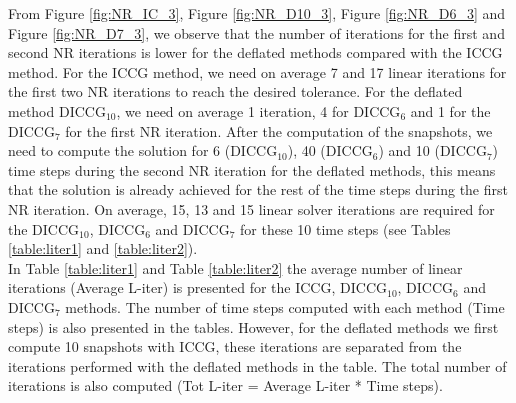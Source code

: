 \documentclass[12pt]{article}
\begin{document}
From Figure \ref{fig:NR_IC_3}, Figure \ref{fig:NR_D10_3}, Figure \ref{fig:NR_D6_3} and Figure \ref{fig:NR_D7_3}, we observe that the number of iterations for the first and second NR iterations is lower for the deflated methods compared with the ICCG method. For the ICCG method, we need on average 7 and 17 linear iterations for the first two NR iterations to reach the desired tolerance. For the deflated method DICCG$_{10}$, we need on average 1 iteration, 4 for DICCG$_6$ and 1 for the DICCG$_7$ for the first NR iteration. After the computation of the snapshots, we need to compute the solution for 6 (DICCG$_{10}$), 40 (DICCG$_{6}$) and 10 (DICCG$_{7}$) time steps during the second NR iteration for the deflated methods, this means that the solution is already achieved for the rest of the time steps during the first NR iteration. On average, 15, 13 and 15 linear solver iterations are required for the DICCG$_{10}$, DICCG$_6$ and DICCG$_7$ for these 10 time steps (see Tables \ref{table:liter1} and \ref{table:liter2}). \\
In Table \ref{table:liter1} and Table \ref{table:liter2} the average number of linear iterations (Average L-iter) is presented for the ICCG, DICCG$_{10}$, DICCG$_6$ and DICCG$_7$ methods. The number of time steps computed with each method (Time steps) is also presented in the tables. However, for the deflated methods we first compute 10 snapshots with ICCG, these iterations are separated from the iterations performed with the deflated methods in the table. The total number of iterations is also computed (Tot L-iter = Average L-iter * Time steps).
\end{document}

